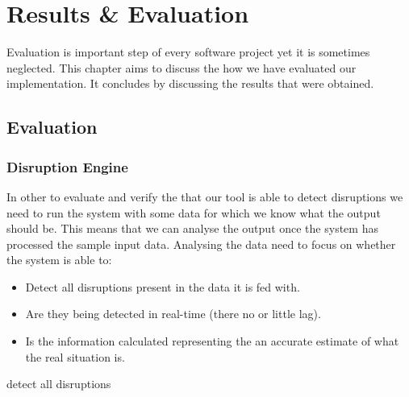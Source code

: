 \chapter{Results \& Evaluation}
Evaluation is important step of every software project yet it is sometimes neglected. This chapter aims to discuss the how we have evaluated our implementation. It concludes by discussing the results that were obtained.

\section{Evaluation}

\subsection{Disruption Engine}
In other to evaluate and verify the that our tool is able to detect disruptions we need to run the system with some data for which we know what the output should be. This means that we can analyse the output once the system has processed the sample input data. Analysing the data need to focus on whether the system is able to:
\begin{itemize}
	\item Detect all disruptions present in the data it is fed with.
	\item Are they being detected in real-time (there no or little lag).
	\item Is the information calculated representing the an accurate estimate of what the real situation is.
\end{itemize} detect all disruptions

